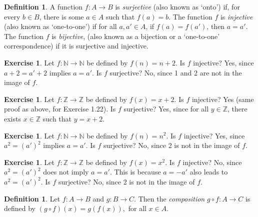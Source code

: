 \documentclass[11pt]{article}
\newcommand{\bbZ}{\mathbb{Z}}
\theoremstyle{definition}
\newtheorem{definition}[theorem]{Definition}
\newtheorem{exercise}[theorem]{Exercise}
\numberwithin{equation}{subsection}
\begin{document}
\begin{definition}  A function $f \colon A \rightarrow B$ is \emph{surjective} (also known as `onto') if, 
for every $b\in B$, there is some $a\in A$ such that $f(a) = b$.  The function $f$ is \emph{injective} (also known as `one-to-one') if for all $a, a' \in A$, if $f(a) = f(a')$, then $a = a'$.  The function $f$ is \emph{bijective}, (also known as a bijection or a `one-to-one' correspondence) if it is surjective and injective.
\end{definition}



\begin{exercise}
Let $f:{\mathbb N}\rightarrow {\mathbb N}$ be defined by $f(n)=n+2$.  Is $f$ injective? Yes, since $a+2 = a'+2$ implies $a = a'$.  Is $f$ surjective? No, since 1 and 2 are not in the image of $f$.
\end{exercise}

\begin{exercise}
Let $f:{\mathbb Z}\rightarrow {\mathbb Z}$ be defined by $f(x)=x+2$.  Is $f$ injective? Yes (same proof as above, for Exercise 1.22).  Is $f$ surjective? Yes, since for all $y \in \bbZ$, there exists $x \in \bbZ$ such that $y=x+2$.
\end{exercise}

\begin{exercise}
Let $f:{\mathbb N}\rightarrow {\mathbb N}$ be defined by $f(n)=n^2$.  Is $f$ injective? Yes, since $a^2 = (a')^2$ implies $a = a'$.  Is $f$ surjective? No, since 2 is not in the image of $f$.
\end{exercise}

\begin{exercise}
Let $f:{\mathbb Z}\rightarrow {\mathbb Z}$ be defined by $f(x)=x^2$.  Is $f$ injective? No, since $a^2 = (a')^2$ does not imply $a=a'$. This is because $a=-a'$ also leads to $a^2 = (a')^2$.  Is $f$ surjective? No, since 2 is not in the image of $f$.
\end{exercise}




\begin{definition}
Let $f:A\longrightarrow B$ and $g:B\longrightarrow C. $ Then the \emph{composition} $g\circ f: A\longrightarrow C$ is defined by $(g\circ f)(x)=g(f(x)),$ for all $x\in A.$ 
\end{definition}
\end{document}
